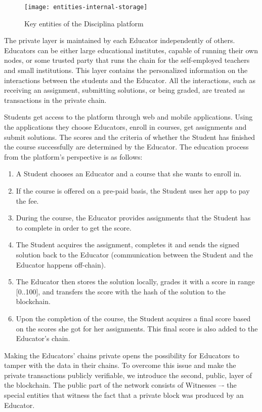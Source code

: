 \begin{figure}[ht]
\centering
\texttt{[image: entities-internal-storage]}
\caption{Key entities of the Disciplina platform}
\label{fig:entities}
\end{figure}

The private layer is maintained by each Educator independently of others.
Educators can be either large educational institutes, capable of running their
own nodes, or some trusted party that runs the chain for the self-employed
teachers and small institutions. This layer contains the personalized
information on the interactions between the students and the Educator. All the
interactions, such as receiving an assignment, submitting solutions, or being
graded, are treated as transactions in the private chain.


Students get access to the platform through web and mobile applications. Using
the applications they choose Educators, enroll in courses, get assignments and
submit solutions. The scores and the criteria of whether the Student has
finished the course successfully are determined by the Educator. The education
process from the platform’s perspective is as follows:

\begin{enumerate}
\item A Student chooses an Educator and a course that she wants to enroll in.
\item If the course is offered on a pre-paid basis, the Student uses her app to
  pay the fee.
\item During the course, the Educator provides assignments that the Student has
  to complete in order to get the score.
\item The Student acquires the assignment, completes it and sends the signed
  solution back to the Educator (communication between the Student and the
  Educator happens off-chain).
\item The Educator then stores the solution locally, grades it with a score in
  range [0..100],  and transfers the score with the hash of the solution to the
  blockchain.
\item Upon the completion of the course, the Student acquires a final score
  based on the scores she got for her assignments. This final score is also
  added to the Educator’s chain.
\end{enumerate}

Making the Educators' chains private opens the possibility for Educators to
tamper with the data in their chains. To overcome this issue and make the
private transactions publicly verifiable, we introduce the second, public, layer
of the blockchain. The public part of the network consists of Witnesses –- the
special entities that witness the fact that a private block was produced by an
Educator.


